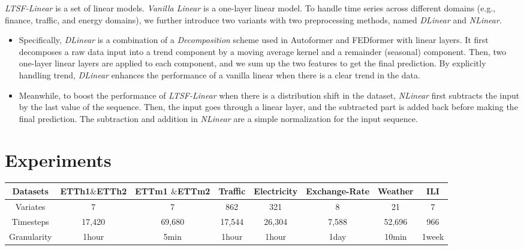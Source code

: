 \documentclass[10pt,twocolumn,letterpaper]{article}
\newcommand{\modelname}{\emph{LTSF-Linear}\xspace}
\begin{document}
\modelname is a set of linear models. \textit{Vanilla Linear} is a one-layer linear model. To handle time series across different domains (e.g., finance, traffic, and energy domains), we further introduce two variants with two preprocessing methods, named \emph{DLinear} and \emph{NLinear}. 

\begin{itemize}

\item Specifically, \emph{DLinear} is a combination of a \emph{Decomposition} scheme used in Autoformer and FEDformer with linear layers. It first decomposes a raw data input into a trend component by a moving average kernel and a remainder (seasonal) component. Then, two one-layer linear layers are applied to each component, and we sum up the two features to get the final prediction.
By explicitly handling trend, \emph{DLinear} enhances the performance of a vanilla linear when there is a clear trend in the data. 
\item Meanwhile, to boost the performance of \modelname when there is a distribution shift in the dataset, \emph{NLinear} first subtracts the input by the last value of the sequence. Then, the input goes through a linear layer, and the subtracted part is added back before making the final prediction. The subtraction and addition in \emph{NLinear} are a simple normalization for the input sequence.
\end{itemize}
 

\section{Experiments}
\label{sec:exp}


\begin{table*}[h]
\vspace{-0.4cm}
\begin{center}
\scalebox{0.8}
{
\begin{tabular}{c|ccccccc} \hline
Datasets       & ETTh1$\&$ETTh2       & ETTm1 $\&$ETTm2        & Traffic     & Electricity  & Exchange-Rate & Weather      & ILI      \\ \hline
Variates       & 7          & 7            & 862         & 321          & 8             & 21          & 7      \\
Timesteps      & 17,420     & 69,680       & 17,544      & 26,304       & 7,588         & 52,696       & 966     \\
Granularity    & 1hour      & 5min         & 1hour       & 1hour        & 1day          & 10min        & 1week    \\ \hline
\end{tabular}}
\end{center}
\vspace{-0.5cm}
\caption{The statistics of the nine popular datasets for the LTSF problem.}
\label{tab:datasets}
\vspace{-0.2cm}
\end{table*}
\end{document}
